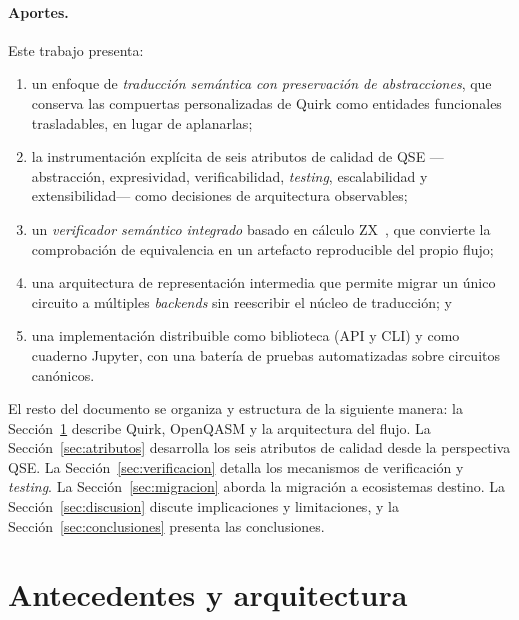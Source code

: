 \documentclass[11pt,a4paper]{article}
\begin{document}
\paragraph{Aportes.} Este trabajo presenta:
\begin{enumerate}[label=(\roman*), leftmargin=2em]
  \item un enfoque de \emph{traducción semántica con preservación de abstracciones}, que
        conserva las compuertas personalizadas de Quirk como entidades funcionales
        trasladables, en lugar de aplanarlas;
  \item la instrumentación explícita de seis atributos de calidad de QSE ---abstracción,
        expresividad, verificabilidad, \emph{testing}, escalabilidad y
        extensibilidad--- como decisiones de arquitectura observables;
  \item un \emph{verificador semántico integrado} basado en cálculo ZX~\cite{kissinger2020pyzx},
        que convierte la comprobación de equivalencia en un artefacto reproducible del
        propio flujo;
  \item una arquitectura de representación intermedia que permite migrar un único circuito
        a múltiples \emph{backends} sin reescribir el núcleo de traducción; y
  \item una implementación distribuible como biblioteca (API y CLI) y como cuaderno Jupyter,
        con una batería de pruebas automatizadas sobre circuitos canónicos.
\end{enumerate}

El resto del documento se organiza y estructura de la siguiente manera: la Sección~\ref{sec:arquitectura} describe
Quirk, OpenQASM y la arquitectura del flujo. La Sección~\ref{sec:atributos} desarrolla los
seis atributos de calidad desde la perspectiva QSE. La Sección~\ref{sec:verificacion}
detalla los mecanismos de verificación y \emph{testing}. La
Sección~\ref{sec:migracion} aborda la migración a ecosistemas destino. La
Sección~\ref{sec:discusion} discute implicaciones y limitaciones, y la
Sección~\ref{sec:conclusiones} presenta las conclusiones.

\section{Antecedentes y arquitectura}
\label{sec:arquitectura}
\end{document}
